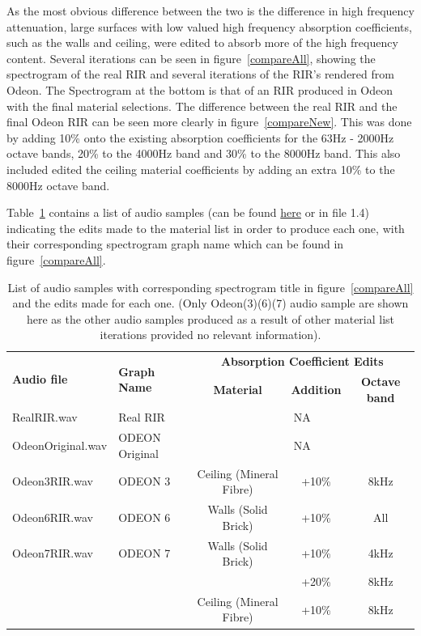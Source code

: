 \documentclass[../../main.tex]{subfiles}
\begin{document}
			 As the most obvious difference between the two is the difference in high frequency attenuation, large surfaces with low valued high frequency absorption coefficients, such as the walls and ceiling, were edited to absorb more of the high frequency content. Several iterations can be seen in figure~\ref{compareAll}, showing the spectrogram of the real \ac{RIR} and several iterations of the \ac{RIR}'s rendered from Odeon. The Spectrogram at the bottom is that of an \ac{RIR} produced in Odeon with the final material selections. The difference between the real RIR and the final Odeon \ac{RIR} can be seen more clearly in figure~\ref{compareNew}. This was done by adding 10\% onto the existing absorption coefficients for the 63Hz - 2000Hz octave bands, 20\% to the 4000Hz band and 30\% to the 8000Hz band. This also included edited the ceiling material coefficients by adding an extra 10\% to the 8000Hz octave band.

			Table~\ref{materialTable} contains a list of audio samples (can be found \href{http://lt669.github.io/pages/audioSamples.html}{here} or in file 1.4) indicating the edits made to the material list in order to produce each one, with their corresponding spectrogram graph name which can be found in figure~\ref{compareAll}.

			\begin{table}[h]
				\centering
				\begin{tabular}{|l | l | c | c | c |} 
					\hline
					\multirow{2}{*}{\textbf{Audio file}} & \multirow{2}{*}{\textbf{Graph Name}} & \multicolumn{3}{c|}{\textbf{Absorption Coefficient Edits}} \\ \cline{3-5}
					 & & \textbf{Material} & \textbf{Addition} & \textbf{Octave band} \\ \hline
					RealRIR.wav & Real RIR & \multicolumn{3}{c|}{NA}\\ \hline
					OdeonOriginal.wav & ODEON Original & \multicolumn{3}{c|}{NA}\\ \hline
					Odeon3RIR.wav & ODEON 3 & Ceiling (Mineral Fibre) & +10\% & 8kHz\\ \hline
					Odeon6RIR.wav & ODEON 6 & Walls (Solid Brick) & +10\% & All\\ \hline
					Odeon7RIR.wav & ODEON 7 & Walls (Solid Brick) & +10\% & 4kHz\\ 
					& & & +20\% & 8kHz \\
					& & Ceiling (Mineral Fibre) & +10\% & 8kHz\\ \hline
				\end{tabular}
				\caption{List of audio samples with corresponding spectrogram title in figure~\ref{compareAll} and the edits made for each one. (Only Odeon(3)(6)(7) audio sample are shown here as the other audio samples produced as a result of other material list iterations provided no relevant information).}
				\label{materialTable}
			\end{table}
\end{document}
